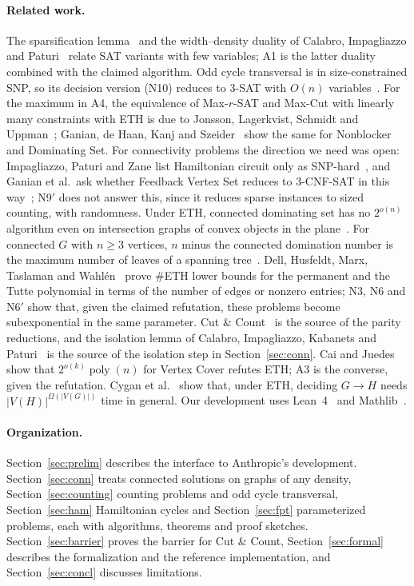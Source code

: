 \documentclass[11pt]{article}
\theoremstyle{remark}
\newcommand{\poly}{\operatorname{poly}}
\begin{document}
\paragraph{Related work.} The sparsification lemma~\cite{IPZ01} and the width--density duality of
Calabro, Impagliazzo and Paturi~\cite{CIP06} relate SAT variants with few variables; A1 is the latter
duality combined with the claimed algorithm. Odd cycle transversal is in size-constrained SNP, so its
decision version (N10) reduces to 3-SAT with $O(n)$ variables~\cite[Thm.~5]{IPZ01}. For the maximum in A4, the equivalence of Max-$r$-SAT
and Max-Cut with linearly many constraints with ETH is due to Jonsson, Lagerkvist, Schmidt and
Uppman~\cite[Thm.~8]{JLSU14}; Ganian, de Haan, Kanj and Szeider~\cite{GdHKS16} show the same for
Nonblocker and Dominating Set. For connectivity problems the direction we need was open:
Impagliazzo, Paturi and Zane list Hamiltonian circuit only as SNP-hard~\cite{IPZ01}, and Ganian et
al.\ ask whether Feedback Vertex Set reduces to 3-CNF-SAT in this way~\cite{GdHKS16}; N9$'$ does
not answer this, since it reduces sparse instances to sized counting, with randomness. Under ETH,
connected dominating set has no $2^{o(n)}$ algorithm even on intersection graphs of convex objects
in the plane~\cite{dBKB26}. For connected $G$ with $n\ge3$ vertices, $n$ minus the connected
domination number is the maximum number of leaves of a spanning tree~\cite{CWY00}. Dell, Husfeldt, Marx, Taslaman and
Wahl\'en~\cite{DHMTW14} prove \#ETH lower bounds for the permanent and the Tutte polynomial in
terms of the number of edges or nonzero entries; N3, N6 and N6$'$ show that, given the claimed
refutation, these problems become subexponential in the same parameter. Cut \&
Count~\cite{CNPPRW11} is the source of the parity reductions, and the isolation lemma of Calabro,
Impagliazzo, Kabanets and Paturi~\cite{CIKP08} is the source of the isolation step in
Section~\ref{sec:conn}. Cai and
Juedes~\cite{CJ03} show that $2^{o(k)}\poly(n)$ for Vertex Cover refutes ETH; A3 is the converse,
given the refutation. Cygan et al.~\cite{CFGKMPS17} show that, under ETH, deciding $G\to H$ needs
$|V(H)|^{\Omega(|V(G)|)}$ time in general. Our development uses Lean~4~\cite{lean4} and
Mathlib~\cite{mathlib}.

\paragraph{Organization.} Section~\ref{sec:prelim} describes the interface to Anthropic's
development. Section~\ref{sec:conn} treats connected solutions on graphs of any density,
Section~\ref{sec:counting} counting problems and odd cycle transversal, Section~\ref{sec:ham} Hamiltonian cycles and
Section~\ref{sec:fpt} parameterized problems, each with algorithms, theorems and proof sketches.
Section~\ref{sec:barrier} proves the barrier for Cut \& Count, Section~\ref{sec:formal} describes the formalization and the reference implementation, and
Section~\ref{sec:concl} discusses limitations.
\end{document}
